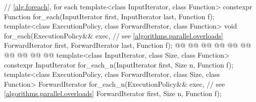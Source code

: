 \begin{codeblock}
{  // \ref{alg.foreach}, for each
  template<class InputIterator, class Function>
    constexpr Function for_each(InputIterator first, InputIterator last, Function f);
  template<class ExecutionPolicy, class ForwardIterator, class Function>
    void for_each(ExecutionPolicy&& exec, // see \ref{algorithms.parallel.overloads}
                  ForwardIterator first, ForwardIterator last, Function f);
  @@
    @@
        @@
      @@
        @@
    @@
        @@
      @@
        @@
  @\added{\}}@
  template<class InputIterator, class Size, class Function>
    constexpr InputIterator for_each_n(InputIterator first, Size n, Function f);
  template<class ExecutionPolicy, class ForwardIterator, class Size, class Function>
    ForwardIterator for_each_n(ExecutionPolicy&& exec, // see \ref{algorithms.parallel.overloads}
                               ForwardIterator first, Size n, Function f);

}
\end{codeblock}
